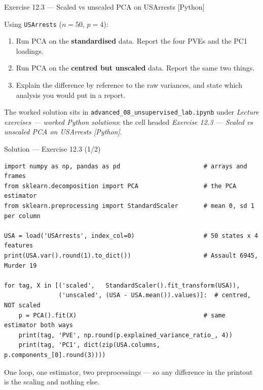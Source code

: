 \documentclass[aspectratio=169,11pt]{beamer}
\begin{document}
\begin{frame}{Exercise 12.3 --- Scaled vs unscaled PCA on USArrests [Python]}
\begin{exercise}
  Using \texttt{USArrests} ($n=50$, $p=4$):
  \begin{enumerate}
    \item Run PCA on the \textbf{standardised} data. Report the four PVEs and the PC1
          loadings.
    \item Run PCA on the \textbf{centred but unscaled} data. Report the same two things.
    \item Explain the difference by reference to the raw variances, and state which
          analysis you would put in a report.
  \end{enumerate}
\end{exercise}
\begin{labnote}
  The worked solution sits in \texttt{advanced\_08\_unsupervised\_lab.ipynb} under
  \emph{Lecture exercises --- worked Python solutions}: the cell headed
  \emph{Exercise 12.3 --- Scaled vs unscaled PCA on USArrests [Python]}.
\end{labnote}
\end{frame}

\begin{frame}[fragile]{Solution --- Exercise 12.3 (1/2)}
\begin{solutionbox}
\begin{lstlisting}[basicstyle=\ttfamily\scriptsize]
import numpy as np, pandas as pd                       # arrays and frames
from sklearn.decomposition import PCA                  # the PCA estimator
from sklearn.preprocessing import StandardScaler       # mean 0, sd 1 per column

USA = load('USArrests', index_col=0)                   # 50 states x 4 features
print(USA.var().round(1).to_dict())                    # Assault 6945, Murder 19

for tag, X in [('scaled',   StandardScaler().fit_transform(USA)),
               ('unscaled', (USA - USA.mean()).values)]:  # centred, NOT scaled
    p = PCA().fit(X)                                   # same estimator both ways
    print(tag, 'PVE', np.round(p.explained_variance_ratio_, 4))
    print(tag, 'PC1', dict(zip(USA.columns, p.components_[0].round(3))))
\end{lstlisting}
\end{solutionbox}
\vspace{-10pt}\footnotesize
\begin{readme}
  One loop, one estimator, two preprocessings --- so any difference in the printout is
  the scaling and nothing else.
\end{readme}
\end{frame}
\end{document}
